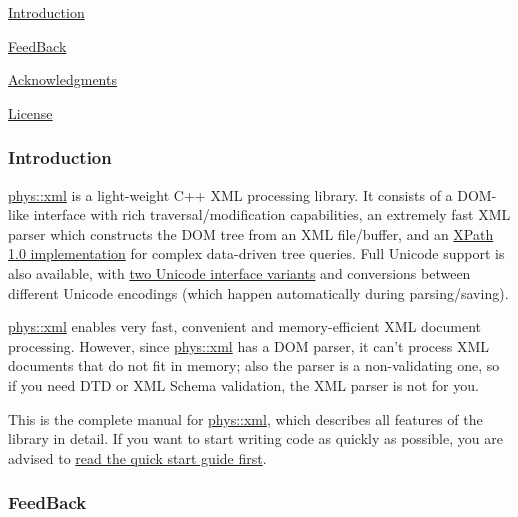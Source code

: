 \begin{DoxyItemize}
\item \hyperlink{XMLManual_XMLIntroduction}{Introduction}
\item \hyperlink{XMLManual_XMLFeedBack}{FeedBack}
\item \hyperlink{XMLManual_XMLAcknowledgments}{Acknowledgments}
\item \hyperlink{XMLManual_XMLLicense}{License}
\end{DoxyItemize}\hypertarget{XMLManual_XMLIntroduction}{}\subsubsection{Introduction}\label{XMLManual_XMLIntroduction}
\hyperlink{namespacephys_1_1xml}{phys::xml} is a light-\/weight C++ XML processing library. It consists of a DOM-\/like interface with rich traversal/modification capabilities, an extremely fast XML parser which constructs the DOM tree from an XML file/buffer, and an \hyperlink{classphys_1_1xml_1_1XPathQuery}{XPath 1.0 implementation} for complex data-\/driven tree queries. Full Unicode support is also available, with \hyperlink{XMLManual_XMLUnicode}{two Unicode interface variants} and conversions between different Unicode encodings (which happen automatically during parsing/saving). \par
 \par
 \hyperlink{namespacephys_1_1xml}{phys::xml} enables very fast, convenient and memory-\/efficient XML document processing. However, since \hyperlink{namespacephys_1_1xml}{phys::xml} has a DOM parser, it can't process XML documents that do not fit in memory; also the parser is a non-\/validating one, so if you need DTD or XML Schema validation, the XML parser is not for you. \par
 \par
 This is the complete manual for \hyperlink{namespacephys_1_1xml}{phys::xml}, which describes all features of the library in detail. If you want to start writing code as quickly as possible, you are advised to \hyperlink{XMLQuickStart}{read the quick start guide first}. \par
 \par
 \hypertarget{XMLManual_XMLFeedBack}{}\subsubsection{FeedBack}\label{XMLManual_XMLFeedBack}
